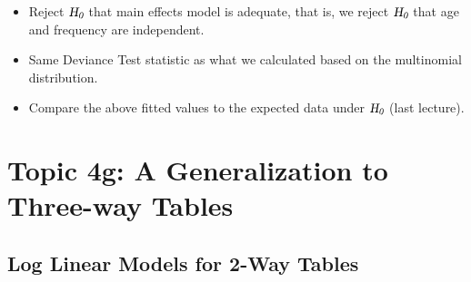 \documentclass{article}\usepackage[]{graphicx}\usepackage[svgnames]{xcolor}
\newcommand{\HN}{\textsl{H}_{\textsl{0}}}%
\begin{document}
\begin{itemize}
    \item Reject $ \HN $ that main effects model is adequate, that is, we reject $ \HN $
          that age and frequency are independent.
    \item Same Deviance Test statistic as what we calculated based on the multinomial
          distribution.
    \item Compare the above fitted values to the expected data under $ \HN $ (last lecture).
\end{itemize}

\section*{Topic 4g: A Generalization to Three-way Tables}
\subsection*{Log Linear Models for 2-Way Tables}
\end{document}

